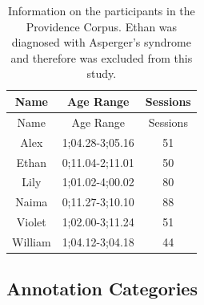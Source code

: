 \documentclass[
  english,
  ,man,floatsintext]{apa6}
\begin{document}
\begin{longtable}[]{@{}ccc@{}}
\caption{\label{tab:providence} Information on the participants in the Providence Corpus. Ethan was diagnosed with Asperger's syndrome and therefore was excluded from this study.}\tabularnewline
\toprule
Name & Age Range & Sessions \\
\midrule
\endfirsthead
\toprule
Name & Age Range & Sessions \\
\midrule
\endhead
Alex & 1;04.28-3;05.16 & 51 \\
Ethan & 0;11.04-2;11.01 & 50 \\
Lily & 1;01.02-4;00.02 & 80 \\
Naima & 0;11.27-3;10.10 & 88 \\
Violet & 1;02.00-3;11.24 & 51 \\
William & 1;04.12-3;04.18 & 44 \\
\bottomrule
\end{longtable}

\hypertarget{annotation-categories-1}{%
\subsection{Annotation Categories}\label{annotation-categories-1}}
\end{document}
